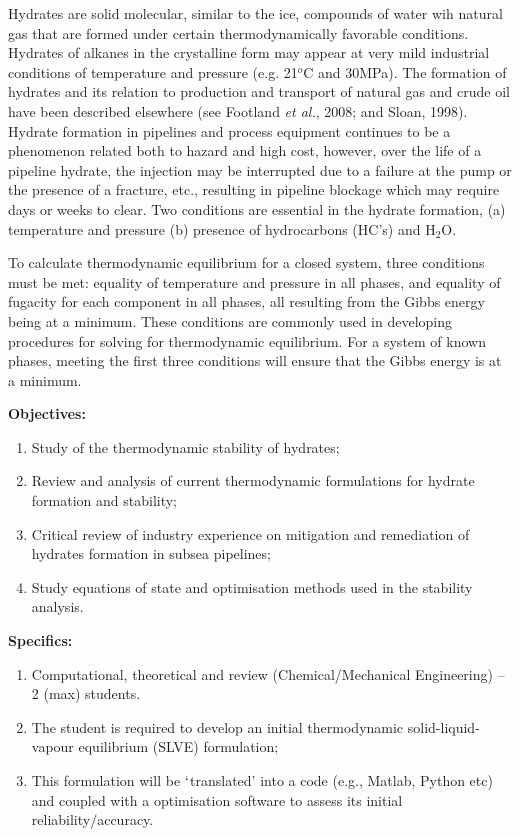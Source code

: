 \documentclass[12pts,a4paper,amsmath,amssymb,floatfix]{article}%
\begin{document}
\begin{enumerate}[label=\bfseries Project \arabic*:]
Hydrates are solid molecular, similar to the ice, compounds of water wih natural gas that are formed under certain thermodynamically favorable conditions. Hydrates of alkanes in the crystalline form may appear at very mild industrial conditions of temperature and pressure (e.g. 21$^{o}$C and 30MPa).  The formation of hydrates and its relation to production and transport of natural gas and crude oil have been described elsewhere (see Footland {\it et al.}, 2008; and Sloan, 1998). Hydrate formation in pipelines and process equipment continues to be a phenomenon related both to hazard and high cost, however, over the life of a pipeline hydrate, the injection may be interrupted due to a failure at the pump or the presence of a fracture, etc., resulting in pipeline blockage which may require days or weeks to clear.  Two conditions are essential in the hydrate formation, (a) temperature and pressure (b) presence of hydrocarbons (HC's) and H$_{2}$O. %

To calculate thermodynamic equilibrium for a closed system, three conditions must be met: equality of temperature and pressure in all phases, and equality of fugacity for each component in all phases, all resulting from the Gibbs energy being at a minimum. These conditions are commonly used in developing procedures for solving for thermodynamic equilibrium. For a system of known phases, meeting the first three conditions will ensure that the Gibbs energy is at a minimum. 

\noindent
{\bf Objectives:}
\begin{enumerate}
\item Study of the thermodynamic stability of hydrates; 
\item Review and analysis of current thermodynamic formulations for hydrate formation and stability;
\item Critical review of industry experience on mitigation and remediation of hydrates formation in subsea pipelines; 
\item Study equations of state and optimisation methods used in the stability analysis.
\end{enumerate} 
 

\noindent
{\bf Specifics:} 
\begin{enumerate}
\item Computational, theoretical and review (Chemical/Mechanical Engineering) -- 2 (max) students. 
\item The student is required to develop an initial thermodynamic solid-liquid-vapour equilibrium (SLVE) formulation;
\item This formulation will be $\lq$translated' into a code (e.g., Matlab, Python etc) and coupled with a optimisation software to assess its initial reliability/accuracy.
\end{enumerate}



\end{enumerate}
\end{document}

